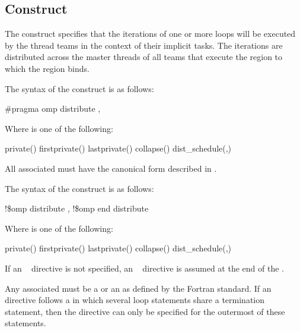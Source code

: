 \subsection{ Construct}
\label{subsec:distribute Construct}
\summary
The  construct specifies that the iterations of one or more loops will be 
executed by the thread teams in the context of their implicit tasks. The iterations are 
distributed across the master threads of all teams that execute the  region to 
which the  region binds.

\syntax
\begin{ccppspecific}
The syntax of the  construct is as follows:

\begin{boxedcode}
\#pragma omp distribute \plc{[clause[ [},\plc{] clause] ... ] new-line}
\end{boxedcode}

Where  is one of the following:

\begin{indentedcodelist}
private()
firstprivate()
lastprivate()
collapse()
dist\_schedule(\plc{kind[},\plc{ chunk\_size]})
\end{indentedcodelist}

All associated  must have the canonical form described in 
.
\end{ccppspecific}
\bigskip

\begin{fortranspecific}
The syntax of the  construct is as follows:

\begin{boxedcode}
!\$omp distribute \plc{[clause[ [},\plc{] clause] ... ]}
\plc{[}!\$omp end distribute\plc{]}
\end{boxedcode}

Where  is one of the following:

\begin{indentedcodelist}
private()
firstprivate()
lastprivate()
collapse()
dist\_schedule(\plc{kind[},\plc{ chunk\_size]})
\end{indentedcodelist}

If an ~ directive is not specified, an ~ directive 
is assumed at the end of the .

Any associated  must be a  or an
 as defined by the Fortran standard. If an 
~ directive follows a  in which several loop statements share a  
termination statement, then the directive can only be specified for the outermost of these 
 statements.
\end{fortranspecific}

